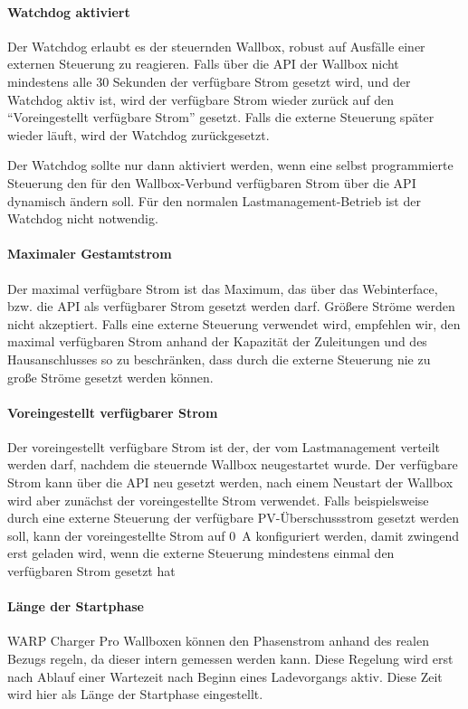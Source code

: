 \documentclass[a4paper,10pt]{article}
\newcommand{\hint}[1]{\begin{tcolorbox}[colback=boxgray,colframe=black,coltext=
white,title=Hinweis,left*=2mm,right*=2mm,boxsep=1mm,bottom=1mm,top=1mm]#1\end{tcolorbox}}
\begin{document}
\begin{multicols*}{2}
    \paragraph{Watchdog aktiviert}
    Der Watchdog erlaubt es der steuernden Wallbox, robust auf Ausfälle einer externen Steuerung zu reagieren. Falls über die API der Wallbox
    nicht mindestens alle 30 Sekunden der verfügbare Strom gesetzt wird, und der Watchdog aktiv ist, wird der verfügbare Strom wieder zurück auf den
    \enquote{Voreingestellt verfügbare Strom} gesetzt. Falls die externe Steuerung später wieder läuft, wird der Watchdog zurückgesetzt.
    \hint{Der Watchdog sollte nur dann aktiviert werden,
    wenn eine selbst programmierte Steuerung den für den Wallbox-Verbund verfügbaren Strom über die API dynamisch ändern soll.
    Für den normalen Lastmanagement-Betrieb ist der Watchdog nicht notwendig.}

    \paragraph{Maximaler Gestamtstrom}
    Der maximal verfügbare Strom ist das Maximum, das über das Webinterface, bzw. die API als verfügbarer Strom gesetzt werden darf.
    Größere Ströme werden nicht akzeptiert. Falls eine externe Steuerung verwendet wird, empfehlen wir, den maximal verfügbaren Strom
    anhand der Kapazität der Zuleitungen und des Hausanschlusses so zu beschränken, dass durch die externe Steuerung nie zu große
    Ströme gesetzt werden können.

    \paragraph{Voreingestellt verfügbarer Strom}
    Der voreingestellt verfügbare Strom ist der, der vom Lastmanagement verteilt werden darf, nachdem die steuernde Wallbox
    neugestartet wurde. Der verfügbare Strom kann über die API neu gesetzt werden, nach einem Neustart der Wallbox wird aber
    zunächst der voreingestellte Strom verwendet. Falls beispielsweise durch eine externe Steuerung der verfügbare PV-Überschussstrom
    gesetzt werden soll, kann der voreingestellte Strom auf \SI{0}{\ampere} konfiguriert werden, damit zwingend erst geladen wird,
    wenn die externe Steuerung mindestens einmal den verfügbaren Strom gesetzt hat
    \paragraph{Länge der Startphase}
    WARP Charger Pro Wallboxen können den Phasenstrom anhand des realen Bezugs regeln, da dieser
    intern gemessen werden kann. Diese Regelung wird erst nach Ablauf einer
    Wartezeit nach Beginn eines Ladevorgangs aktiv. Diese Zeit wird hier als
    Länge der Startphase eingestellt.


\end{multicols*}
\end{document}
